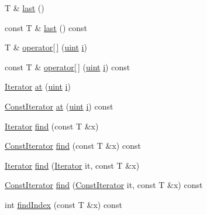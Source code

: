 \begin{DoxyCompactItemize}
\item 
T \& \hyperlink{class_q_value_list_a3252f2d646f83b0610491336e6d633e0}{last} ()
\item 
const T \& \hyperlink{class_q_value_list_a7fd5587a244b255f344cbb3974b43e87}{last} () const 
\item 
T \& \hyperlink{class_q_value_list_aa622945b6e828359e93eab0feb15f786}{operator\mbox{[}$\,$\mbox{]}} (\hyperlink{qglobal_8h_a4d3943ddea65db7163a58e6c7e8df95a}{uint} \hyperlink{060__command__switch_8tcl_a8c90afd4641b25be86bd09983c3cbee0}{i})
\item 
const T \& \hyperlink{class_q_value_list_a75ea6002cc8f413b4020c453e76d7037}{operator\mbox{[}$\,$\mbox{]}} (\hyperlink{qglobal_8h_a4d3943ddea65db7163a58e6c7e8df95a}{uint} \hyperlink{060__command__switch_8tcl_a8c90afd4641b25be86bd09983c3cbee0}{i}) const 
\item 
\hyperlink{class_q_value_list_a043c8661906b45f062d493601804a5ea}{Iterator} \hyperlink{class_q_value_list_a3e5c6cd00979923b53907f436121cabe}{at} (\hyperlink{qglobal_8h_a4d3943ddea65db7163a58e6c7e8df95a}{uint} \hyperlink{060__command__switch_8tcl_a8c90afd4641b25be86bd09983c3cbee0}{i})
\item 
\hyperlink{class_q_value_list_a945cde34d45626792d1c5c8012b9b680}{Const\+Iterator} \hyperlink{class_q_value_list_a965f188d25a5a5c5537d692eba2f12d8}{at} (\hyperlink{qglobal_8h_a4d3943ddea65db7163a58e6c7e8df95a}{uint} \hyperlink{060__command__switch_8tcl_a8c90afd4641b25be86bd09983c3cbee0}{i}) const 
\item 
\hyperlink{class_q_value_list_a043c8661906b45f062d493601804a5ea}{Iterator} \hyperlink{class_q_value_list_aabb68d0b803d79978ba5e3ec31666609}{find} (const T \&x)
\item 
\hyperlink{class_q_value_list_a945cde34d45626792d1c5c8012b9b680}{Const\+Iterator} \hyperlink{class_q_value_list_a715e9df662b4237779f130d93bff70a3}{find} (const T \&x) const 
\item 
\hyperlink{class_q_value_list_a043c8661906b45f062d493601804a5ea}{Iterator} \hyperlink{class_q_value_list_abb6344c15f2d8905f6fcbed89314c6ec}{find} (\hyperlink{class_q_value_list_a043c8661906b45f062d493601804a5ea}{Iterator} it, const T \&x)
\item 
\hyperlink{class_q_value_list_a945cde34d45626792d1c5c8012b9b680}{Const\+Iterator} \hyperlink{class_q_value_list_ac7bae356983bbc40e51803adf275ed50}{find} (\hyperlink{class_q_value_list_a945cde34d45626792d1c5c8012b9b680}{Const\+Iterator} it, const T \&x) const 
\item 
int \hyperlink{class_q_value_list_a9e7a73545d583398e53c5850e60dd41c}{find\+Index} (const T \&x) const 

\end{DoxyCompactItemize}
